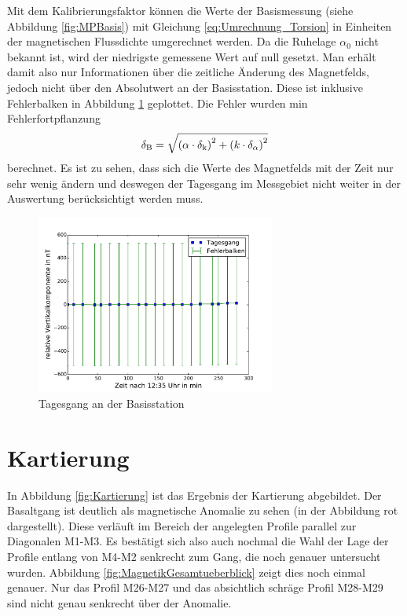 Mit dem Kalibrierungsfaktor können die Werte der Basismessung (siehe Abbildung \ref{fig:MPBasis}) mit Gleichung \eqref{eq:Umrechnung_Torsion} in Einheiten der magnetischen Flussdichte umgerechnet werden. Da die Ruhelage $\alpha_0$ nicht bekannt ist, wird der niedrigste gemessene Wert auf null gesetzt. Man erhält damit also nur Informationen über die zeitliche Änderung des Magnetfelds, jedoch nicht über den Absolutwert an der Basisstation. Diese ist inklusive Fehlerbalken in Abbildung \ref{fig:tagesgang} geplottet. Die Fehler wurden min Fehlerfortpflanzung
\begin{equation}
 \delta_{\mathrm{B}}=\sqrt{\left(\alpha\cdot\delta_{\mathrm{k}}\right)^2+\left(k\cdot\delta_{\mathrm{\alpha}}\right)^2}
\end{equation}
berechnet. Es ist zu sehen, dass sich die Werte des Magnetfelds mit der Zeit nur sehr wenig ändern und deswegen der Tagesgang im Messgebiet nicht weiter in der Auswertung berücksichtigt werden muss.

\begin{figure}
 \centering
 \includegraphics[width=0.7\textwidth]{fig/tagesgang}
 \caption{Tagesgang an der Basisstation}
 \label{fig:tagesgang}
\end{figure}

\section{Kartierung}

In Abbildung \ref{fig:Kartierung} ist das Ergebnis der Kartierung abgebildet. Der Basaltgang ist deutlich als magnetische Anomalie zu sehen (in der Abbildung rot dargestellt). Diese verläuft im Bereich der angelegten Profile parallel zur Diagonalen M1-M3. Es bestätigt sich also auch nochmal die Wahl der Lage der Profile entlang von M4-M2 senkrecht zum Gang, die noch genauer untersucht wurden. Abbildung \ref{fig:MagnetikGesamtueberblick} zeigt dies noch einmal genauer. Nur das Profil M26-M27 und das absichtlich schräge Profil M28-M29 sind nicht genau senkrecht über der Anomalie.

